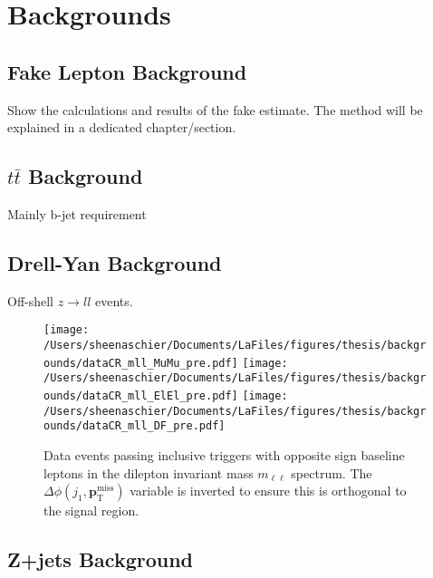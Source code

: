 \chapter{Backgrounds}

\section{Fake Lepton Background}
Show the calculations and results of the fake estimate.  The method will be explained in a dedicated chapter/section.

\section{$t\bar{t}$ Background}
\label{sec:top}
Mainly b-jet requirement

\section{Drell-Yan Background}
\label{sec:mettrigger}
Off-shell $z\rightarrow ll$ events.

 \begin{figure}
 \centering
    \texttt{[image: /Users/sheenaschier/Documents/LaFiles/figures/thesis/backgrounds/dataCR\_mll\_MuMu\_pre.pdf]}
 \texttt{[image: /Users/sheenaschier/Documents/LaFiles/figures/thesis/backgrounds/dataCR\_mll\_ElEl\_pre.pdf]}
  \texttt{[image: /Users/sheenaschier/Documents/LaFiles/figures/thesis/backgrounds/dataCR\_mll\_DF\_pre.pdf]}
  \caption{Data events passing inclusive \met{} triggers with opposite sign baseline leptons in the dilepton invariant mass $m_{\ell\ell}$ spectrum. The $\Delta\phi(j_1, \mathbf{p}_\mathrm{    T}^\mathrm{miss})$ variable is inverted to ensure this is orthogonal to the signal region.}
  \label{fig:mll_data}
 \end{figure}
\FloatBarrier

\section{Z+jets Background}
\label{sec:elements}


 
